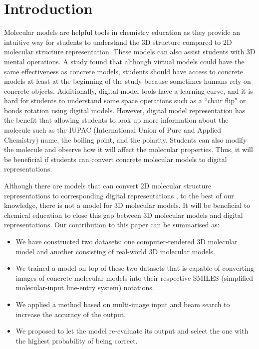 \documentclass[12pt]{article}
\begin{document}
\section{Introduction}
Molecular models are helpful tools in chemistry education as they provide an intuitive way for students to understand the 3D structure compared to 2D molecular structure representation. These models can also assist students with 3D mental operations. 
A study \autocite{savec_evaluating_2005} found that although virtual models could have the same effectiveness as concrete models, students should have access to concrete models at least at the beginning of the study because sometimes humans rely on concrete objects. Additionally, digital model tools have a learning curve, and it is hard for students to understand some space operations such as a ``chair flip" or bonds rotation using digital models. 
However, digital model representation has the benefit that allowing students to look up more information about the molecule such as the IUPAC (International Union of Pure and Applied Chemistry) name, the boiling point, and the polarity. Students can also modify the molecule and observe how it will affect the molecular properties. Thus, it will be beneficial if students can convert concrete molecular models to digital representations. 


Although there are models that can convert 2D molecular structure representations to corresponding digital representations \autocite{swinocsr}\autocite{decimer}\autocite{chempix}, to the best of our knowledge, there is not a model for 3D molecular models. It will be beneficial to chemical education to close this gap between 3D molecular models and digital representations. 
Our contribution to this paper can be summarised as:
\begin{itemize}
\item We have constructed two datasets: one computer-rendered 3D molecular model and another consisting of real-world 3D molecular models.
\item We trained a model on top of these two datasets that is capable of converting images of concrete molecular models into their respective SMILES (simplified molecular-input line-entry system) notations. 
\item We applied a method based on multi-image input and beam search to increase the accuracy of the output.
\item  We proposed to let the model re-evaluate its output and select the one with the highest probability of being correct.
\end{itemize}
\end{document}
